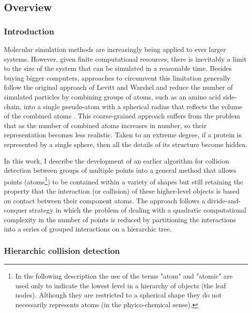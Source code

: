 \subsection{Overview}

\subsubsection{Introduction}

Molecular simulation methods are increasingly being applied to ever larger systems.
However, given finite computational resources, there is inevitably a limit to the size of
the system that can be simulated in a reasonable time.   Besides buying bigger computers, approaches to 
circumvent this limitation generally follow the original approach of Levitt and Warshel
\cite{LevittMet75}
and reduce the number of simulated particles by combining groups of atoms, such as an
amino acid side-chain, into a single pseudo-atom with a spherical radius that
reflects the volume of the combined atoms
\cite{BondPJet07,IzvekovSet05}.
This coarse-grained approach suffers from the problem that as the number of combined
atoms increases in number, so their representation becomes less realistic.  Taken
to an extreme degree, if a protein is represented by a single sphere, then all 
the details of its structure become hidden.  

In this work, I describe the development of an earlier algorithm for collision 
detection between groups of multiple points 
\cite{KatsimitsouliaZet10a,TaylorWRet10a}
into a general method that allows
points (atoms\footnote{
In the following description the use of the terms "atom" and "atomic" are used
only to indicate the lowest level in a hierarchy of objects (the leaf nodes).
Although they are restricted to a spherical shape they do not necessarily
represents atoms (in the phyico-chemical sense). 
}) to be contained within a variety of shapes but still retaining the 
property that the interaction (or collision) of these higher-level objects is based
on contact between their component atoms.
The approach follows a divide-and-conquer strategy in which the problem of
dealing with a quadratic computational complexity in the number of points
is reduced by partitioning the interactions into a series of grouped interactions
on a hierarchic tree.

\subsubsection{Hierarchic collision detection}

